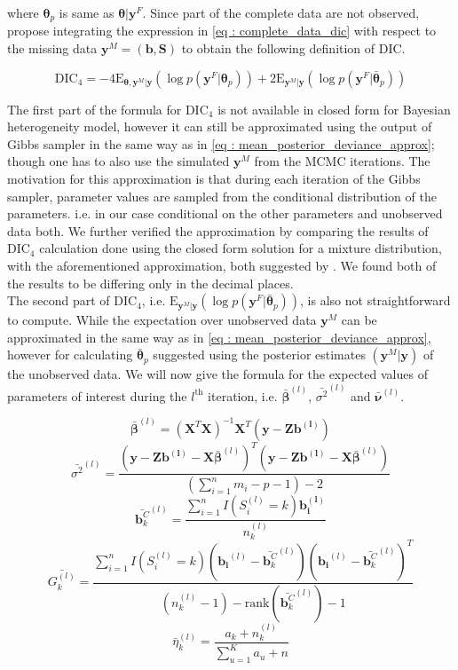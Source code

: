 where $\boldsymbol{\theta}_p$ is same as $\boldsymbol{\theta} | \boldsymbol{y}^F$. Since part of the complete data are not observed, \citet{celeux_deviance_2006} propose integrating the expression in \ref{eq : complete_data_dic} with respect to the missing data $\boldsymbol{y}^M = (\boldsymbol{b}, \boldsymbol{S})$ to obtain the following definition of DIC.

\begin{equation}
\label{eq : DIC4}
\text{DIC}_4 = -4\text{E}_{\boldsymbol{\theta}, \boldsymbol{y}^M|\boldsymbol{y}}(\log{p(\boldsymbol{y}^F|\boldsymbol{\theta}_p)}) + 
2\text{E}_{\boldsymbol{y}^M|\boldsymbol{y}}(\log{p(\boldsymbol{y}^F|\boldsymbol{\bar{\theta}}_p)})
\end{equation}

The first part of the formula for $\text{DIC}_4$ is not available in closed form for Bayesian heterogeneity model, however it can still be approximated using the output of Gibbs sampler in the same way as in \ref{eq : mean_posterior_deviance_approx}; though one has to also use the simulated $\boldsymbol{y}^M$ from the MCMC iterations. The motivation for this approximation is that during each iteration of the Gibbs sampler, parameter values are sampled from the conditional distribution of the parameters. i.e. in our case conditional on the other parameters and unobserved data both. We further verified the approximation by comparing the results of $\text{DIC}_4$ calculation done using the closed form solution for a mixture distribution, with the aforementioned approximation, both suggested by \citet{celeux_deviance_2006}. We found both of the results to be differing only in the decimal places.\\

The second part of $\text{DIC}_4$, i.e. $\text{E}_{\boldsymbol{y}^M|\boldsymbol{y}}(\log{p(\boldsymbol{y}^F|\boldsymbol{\bar{\theta}}_p)})$, is also not straightforward to compute. While the expectation over unobserved data $\boldsymbol{y}^M$ can be approximated in the same way as in \ref{eq : mean_posterior_deviance_approx}, however for calculating $\boldsymbol{\bar{\theta}}_p$ \citet{celeux_deviance_2006} suggested using the posterior estimates  $(\boldsymbol{y}^M|\boldsymbol{y})$ of the unobserved data. We will now give the formula for the expected values of parameters of interest during the $l^\text{th}$ iteration, i.e. $\boldsymbol{\bar{\beta}}^{(l)}$, $\bar{\sigma^2}^{(l)}$ and $\boldsymbol{\bar{\nu}}^{(l)}$.

$$\boldsymbol{\bar{\beta}}^{(l)} = (\boldsymbol{X}^T\boldsymbol{X})^{-1}\boldsymbol{X}^T(\boldsymbol{y}-\boldsymbol{Zb^{(l)}})$$
$$\bar{\sigma^2}^{(l)} = \frac {(\boldsymbol{y}-\boldsymbol{Zb^{(l)}}-\boldsymbol{X}\boldsymbol{\bar{\beta}}^{(l)})^T (\boldsymbol{y}-\boldsymbol{Zb^{(l)}}-\boldsymbol{X}\boldsymbol{\bar{\beta}}^{(l)})} {(\sum_{i=1}^n m_i - p - 1) -2}$$
$$\bar{\boldsymbol{b}_k^C}^{(l)} = \frac {\sum_{i=1}^n I(S_i^{(l)}=k) \boldsymbol{b_i^{(l)}}} {n_k^{(l)}}$$
$$\bar{G_k^{(l)}} = \frac {\sum_{i=1}^n I(S_i^{(l)}=k) (\boldsymbol{b_i}^{(l)}-\bar{\boldsymbol{b}_k^C}^{(l)})(\boldsymbol{b_i}^{(l)}-\bar{\boldsymbol{b}_k^C}^{(l)})^T} 
{(n_k^{(l)} - 1) - \text{rank}(\bar{\boldsymbol{b}_k^C}^{(l)}) - 1}$$
$$\bar{\eta}_k^{(l)} = \frac {a_k + n_k^{(l)}} {\sum_{u=1}^K a_u + n}$$

